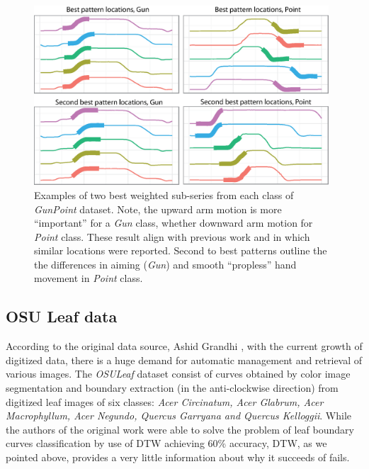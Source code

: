\documentclass{llncs}
\begin{document}
\begin{figure}[t]
   \centering
   \includegraphics[width=110mm]{figures/shapelet-patterns.ps}
   \caption{Examples of two best weighted sub-series from each class of \textit{GunPoint} dataset. 
   Note, the upward arm motion is more ``important'' for a \textit{Gun} class, whether downward arm
motion for \textit{Point} class. These result align with previous work \cite{shapelet} and
\cite{bagnal} in which similar locations were reported. Second to best patterns outline the the
differences in aiming (\textit{Gun}) and smooth ``propless'' hand movement in \textit{Point} class.
   }
   \label{fig:shapelet-like-patterns}
\end{figure}

\subsection{OSU Leaf data}
According to the original data source, Ashid Grandhi \cite{osuleaf}, with the current growth of
digitized data, there is a huge demand for automatic management and retrieval of various images. The
\textit{OSULeaf} dataset consist of curves obtained by color image segmentation and boundary
extraction (in the anti-clockwise direction) from digitized leaf images of six classes: \textit{Acer
Circinatum, Acer Glabrum, Acer Macrophyllum, Acer Negundo, Quercus Garryana and Quercus Kelloggii}.
While the authors of the original work were able to solve the problem of leaf boundary curves
classification by use of DTW achieving 60\% accuracy, DTW, as we pointed above, provides a very
little information about why it succeeds of fails. 
\end{document}
